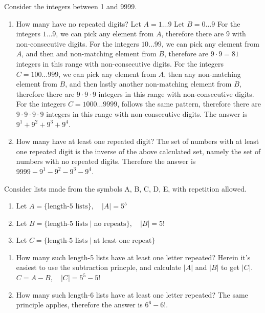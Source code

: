 \documentclass[openany, 12pt]{book}
\begin{document}
\begin{exercise}{}{}
	Consider the integers between 1 and 9999.
	\begin{enumerate}[label = {(\arabic*)}]
		\item How many have no repeated digits?
		      Let $A=1\ldots 9$
		      Let $B=0\ldots 9$
		      For the integers $1\ldots 9$, we can pick any element from $A$, therefore
		      there are $9$ with non-consecutive digits.
		      For the integers $10\ldots 99$, we can pick any element from $A$, and then
		      and non-matching element from $B$, therefore are $9\cdot9=81$ integers in
		      this range with non-consecutive digits.
		      For the integers $C=100\ldots 999$, we can pick any element from $A$, then
		      any non-matching element from $B$, and then lastly another non-matching
		      element from $B$, therefore there are $9\cdot9\cdot9$ integers in this range
		      with non-consecutive digits.
		      For the integers $C=1000\ldots 9999$, follows the same pattern, therefore
		      there are $9\cdot9\cdot9\cdot9$ integers in this range
		      with non-consecutive digits.
		      The answer is $9^1 + 9^2 + 9^3 + 9^4$.

		\item How many have at least one repeated digit?
		      The set of numbers with at least one repeated digit is the inverse of the
		      above calculated set, namely the set of numbers with no repeated digits.
		      Therefore the answer is $9999 - 9^1 - 9^2 - 9^3 - 9^4$.
	\end{enumerate}
\end{exercise}

\begin{exercise}{}{}
	Consider lists made from the symbols A, B, C, D, E, with repetition allowed.
	\begin{enumerate}[label={}, leftmargin=*, itemsep=0pt, parsep=0pt]
		\item Let $A=\{\text{length-5 lists}\},\quad |A| = 5^5$
		\item Let $B=\{\text{length-5 lists}\mid\text{no repeats}\}, \quad |B| = 5!$
		\item Let $C=\{\text{length-5 lists}\mid\text{at least one repeat}\}$
	\end{enumerate}
	\begin{enumerate}[label = {(\alph*)}]
		\item How many such length-5 lists have at least one letter repeated?
		      Herein it's easiest to use the subtraction princple, and calculate $|A|$
		      and $|B|$ to get $|C|$.
		      $C=A - B, \quad |C| = 5^5 - 5! $
		\item How many such length-6 lists have at least one letter repeated?
		      The same principle applies, therefore the answer is $6^6 - 6!$.
	\end{enumerate}
\end{exercise}
\end{document}
